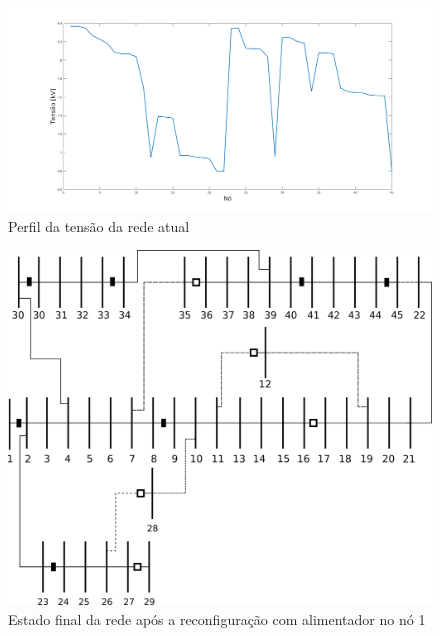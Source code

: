 





\begin{figure}[H]
    \centering
    \includegraphics[width=\textwidth]{01_img/Perfil_tensao_atual.png}
    \caption{Perfil da tensão da rede atual}
    \label{fig:voltages_atual}
\end{figure}









\begin{figure}[H]
    \centering
    \includegraphics[width=\textwidth]{01_img/rede_otimizada.png}
    \caption{Estado final da rede após a reconfiguração com alimentador no nó 1}
    \label{fig:rede_otim}
\end{figure}

